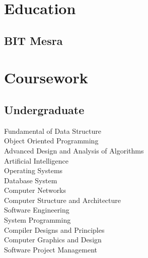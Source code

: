 \documentclass[]{deedy-resume-openfont}
\begin{document}
\begin{minipage}[t]{0.33\textwidth} 


\section{Education} 
\subsection{BIT Mesra} 

\sectionsep


\section{Coursework}


\subsection{Undergraduate}

Fundamental of Data Structure \\
Object Oriented Programming \\ 
Advanced Design and Analysis of Algorithms \\ 
Artificial Intelligence \\ 
Operating Systems \\ 
Database System \\ 
Computer Networks \\ 
Computer Structure and Architecture \\ 
Software Engineering\\
System Programming\\
Compiler Designs and Principles\\
Computer Graphics and Design\\
Software Project Management\\
\sectionsep


\end{minipage}
\end{document}

